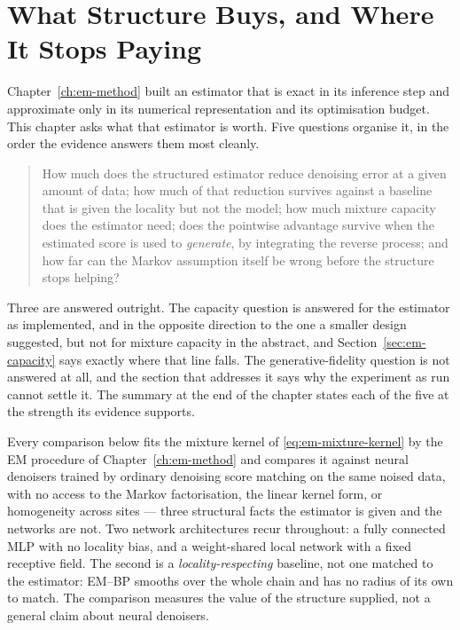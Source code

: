 %

\chapter{What Structure Buys, and Where It Stops Paying}
\label{ch:em-results}

Chapter~\ref{ch:em-method} built an estimator that is exact in its inference
step and approximate only in its numerical representation and its
optimisation budget. This chapter asks what that estimator is worth. Five
questions organise it, in the order the evidence answers them most cleanly.

\begin{quote}
How much does the structured estimator reduce denoising error at a given
amount of data; how much of that reduction survives against a baseline that is
given the locality but not the model; how much mixture capacity does the
estimator need; does the pointwise advantage survive when the estimated score
is used to \emph{generate}, by integrating the reverse process; and how far can
the Markov assumption itself be wrong before the structure stops helping?
\end{quote}

\noindent Three are answered outright. The capacity question is answered for
the estimator as implemented, and in the opposite direction to the one a
smaller design suggested, but not for mixture capacity in the abstract, and
Section~\ref{sec:em-capacity} says exactly where that line falls. The
generative-fidelity question is not answered at all, and the section that
addresses it says why the experiment as run cannot settle it. The summary at the
end of the chapter states each of the five at the strength its evidence
supports.

Every comparison below fits the mixture kernel of \eqref{eq:em-mixture-kernel}
by the EM procedure of Chapter~\ref{ch:em-method} and compares it against
neural denoisers trained by ordinary denoising score matching on the same
noised data, with no access to the Markov factorisation, the linear kernel
form, or homogeneity across sites --- three structural facts the estimator is
given and the networks are not. Two network architectures recur throughout: a
fully connected MLP with no locality bias, and a weight-shared local network
with a fixed receptive field. The second is a \emph{locality-respecting}
baseline, not one matched to the estimator: EM--BP smooths over the whole chain
and has no radius of its own to match. The comparison measures the value of the
structure supplied, not a general claim about neural denoisers.

